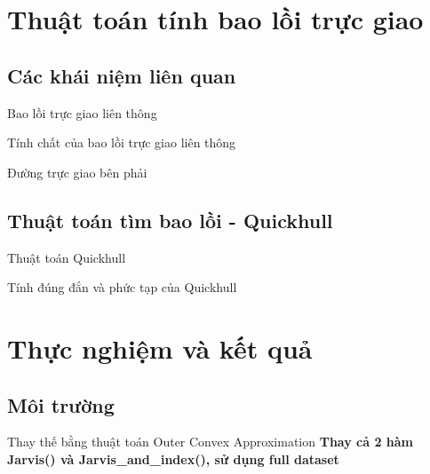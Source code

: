 \documentclass[11pt]{beamer}
\theoremstyle{definition}
\theoremstyle{plain}
\theoremstyle{plain}
\theoremstyle{remark}
\begin{document}
	\section{Thuật toán tính bao lồi trực giao}
	\subsection{Các khái niệm liên quan}
	\begin{frame}{Bao lồi trực giao liên thông}
		
	\end{frame}
	\begin{frame}{Tính chất của bao lồi trực giao liên thông}
		
	\end{frame}
	\begin{frame}{Đường trực giao bên phải}
		
	\end{frame}
	
	\subsection{Thuật toán tìm bao lồi - Quickhull}
	\begin{frame}{ Thuật toán Quickhull}
		
	\end{frame}
	\begin{frame}{Tính đúng đắn và phức tạp của Quickhull}
		
	\end{frame}
	\section{Thực nghiệm và kết quả}
	\subsection{Môi trường}
	\begin{frame}{Thay thế bằng thuật toán Outer Convex Approximation}
		\textbf{Thay cả 2 hàm Jarvis() và Jarvis\_and\_index(), sử dụng full dataset}
	\end{frame}
	
\end{document}
